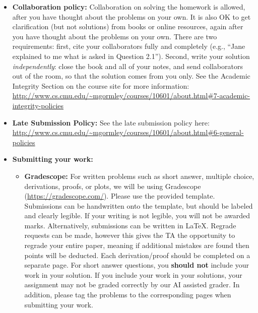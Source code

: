 \documentclass[11pt,addpoints,answers]{exam}
\numberwithin{equation}{section} %
\numberwithin{figure}{section} %
\numberwithin{table}{section} %
\begin{document}
\begin{itemize}
\item \textbf{Collaboration policy:} Collaboration on solving the homework is allowed, after you have thought about the problems on your own. It is also OK to get clarification (but not solutions) from books or online resources, again after you have thought about the problems on your own. There are two requirements: first, cite your collaborators fully and completely (e.g., ``Jane explained to me what is asked in Question 2.1''). Second, write your solution {\em independently}: close the book and all of your notes, and send collaborators out of the room, so that the solution comes from you only.  See the Academic Integrity Section on the course site for more information: \url{http://www.cs.cmu.edu/~mgormley/courses/10601/about.html#7-academic-integrity-policies}

\item\textbf{Late Submission Policy:} See the late submission policy here: \url{http://www.cs.cmu.edu/~mgormley/courses/10601/about.html#6-general-policies}

\item\textbf{Submitting your work:} 

\begin{itemize}

\item \textbf{Gradescope:} For written problems such as short answer, multiple choice, derivations, proofs, or plots, we will be using Gradescope (\url{https://gradescope.com/}). Please use the provided template. Submissions can be handwritten onto the template, but should be labeled and clearly legible. If your writing is not legible, you will not be awarded marks. Alternatively, submissions can be written in LaTeX. Regrade requests can be made, however this gives the TA the opportunity to regrade your entire paper, meaning if additional mistakes are found then points will be deducted.
Each derivation/proof should be completed on a separate page. For short answer questions, you \textbf{should not} include your work in your solution.  If you include your work in your solutions, your assignment may not be graded correctly by our AI assisted grader. In addition, please tag the problems to the corresponding pages when submitting your work.

\end{itemize}


\end{itemize}
\end{document}
